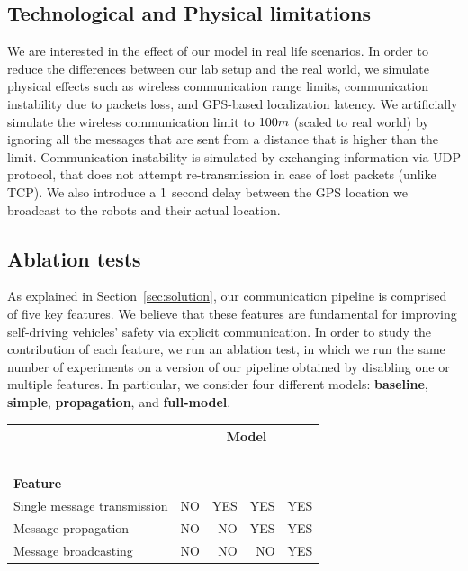 \subsection{Technological and Physical limitations}
We are interested in the effect of our model in real life scenarios. In order to reduce the differences between
our lab setup and the real world, we simulate physical effects such as wireless communication range limits,
communication instability due to packets loss, and GPS-based localization latency.
We artificially simulate the wireless communication limit to $\wireless_limit_meter m$ (scaled to real world) by
ignoring all the messages that are sent from a distance that is higher than the limit. Communication instability
is simulated by exchanging information via UDP protocol, that does not attempt re-transmission in case
of lost packets (unlike TCP). We also introduce a $\gps_delay_sec$ second delay between the GPS location
we broadcast to the robots and their actual location.

\subsection{Ablation tests}
As explained in Section~\ref{sec:solution}, our communication pipeline is comprised of five key features.
We believe that these features are fundamental for improving self-driving vehicles' safety via explicit
communication. In order to study the contribution of each feature, we run an ablation test, in which we
run the same number of experiments on a version of our pipeline obtained by disabling one or multiple
features.
In particular, we consider four different models: \textbf{baseline}, \textbf{simple}, \textbf{propagation},
and \textbf{full-model}.

\begin{table}[H]
\centering
\begin{tabular}{|l|r|r|r|r|}
\hline
&
\multicolumn{4}{c|}{\textbf{Model}} \\
\hline
&
	\parbox[t]{2mm}{}
	&
	\parbox[t]{2mm}{}
	&
	\parbox[t]{2mm}{}
	&
	\parbox[t]{2mm}{}
\\
& & & & \\
& & & & \\
& & & & \\
& & & & \\
\textbf{Feature} & & & & \\
\hline
Single message transmission & NO & YES & YES & YES \\
\hline
Message propagation & NO & NO & YES & YES \\
\hline
Message broadcasting & NO & NO & NO & YES \\
\hline
\end{tabular}
\end{table}


